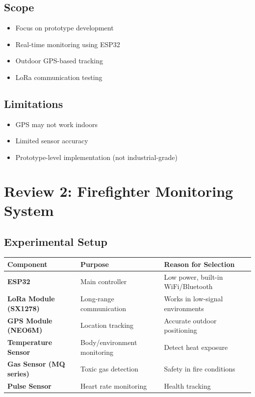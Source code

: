 \documentclass[12pt,a4paper]{article}
\begin{document}
	\subsection{Scope}
	\begin{itemize}
		\item Focus on prototype development
		\item Real-time monitoring using ESP32
		\item Outdoor GPS-based tracking
		\item LoRa communication testing
	\end{itemize}
	
	\subsection{Limitations}
	\begin{itemize}
		\item GPS may not work indoors
		\item Limited sensor accuracy
		\item Prototype-level implementation (not industrial-grade)
	\end{itemize}
	
	\section{Review 2: Firefighter Monitoring System}
	
	\subsection{Experimental Setup}
	
	\begin{center}
		\begin{tabular}{>{\bfseries}p{4.5cm} p{4.5cm} p{5cm}}
			\toprule
			Component & Purpose & Reason for Selection \\
			\midrule
			ESP32 & Main controller & Low power, built-in WiFi/Bluetooth \\
			LoRa Module (SX1278) & Long-range communication & Works in low-signal environments \\
			GPS Module (NEO6M) & Location tracking & Accurate outdoor positioning \\
			Temperature Sensor & Body/environment monitoring & Detect heat exposure \\
			Gas Sensor (MQ series) & Toxic gas detection & Safety in fire conditions \\
			Pulse Sensor & Heart rate monitoring & Health tracking \\
			\bottomrule
		\end{tabular}
	\end{center}
	
\end{document}
